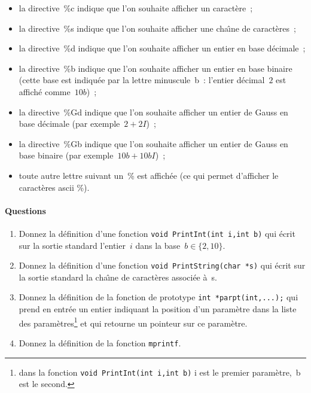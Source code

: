 \begin{itemize}
\item  la directive~\%c indique que l'on souhaite afficher un caract\`ere~;
\item la directive~\%s indique que l'on souhaite afficher une
  cha\^\i{}ne de caract\`eres~;
\item la directive~\%d indique que l'on souhaite afficher un entier en
  base d\'ecimale~;
\item la directive~\%b indique que l'on souhaite afficher un entier en
  base binaire (cette base est indiqu\'ee par la lettre
  minuscule~b~: l'entier d\'ecimal~$2$ est affich\'e comme~$10b$)~;
\item la directive~\%Gd indique que l'on souhaite afficher un entier de
  Gauss en base d\'ecimale (par exemple~$2 + 2 I$)~;
\item la directive~\%Gb indique que l'on souhaite afficher un entier
  de Gauss en base binaire (par exemple~$ 10b + 10b I$)~;
\item toute autre lettre suivant un~\% est affich\'ee (ce qui permet
  d'afficher le caract\`eres ascii \%).
\end{itemize}

\paragraph{Questions}
\begin{enumerate}
\item Donnez la d\'efinition d'une fonction %
  \verb?void PrintInt(int i,int b)? qui \'ecrit sur la sortie
  standard l'entier~$i$ dans la base~${b\in\{2,10\}}$.
\item 
  Donnez la d\'efinition d'une fonction %
  \verb?void PrintString(char *s)? qui \'ecrit sur la sortie standard
  la cha\^\i{}ne de caract\`eres associ\'ee \`a~s.
\item Donnez la d\'efinition de la fonction de prototype %
  \verb?int *parpt(int,...);? qui prend en entr\'ee un entier
  indiquant la position d'un param\`etre
dans la liste des param\`etres\footnote{dans la fonction %
  \verb?void PrintInt(int i,int b)? i est le premier param\`etre,~b est le second.}
et qui retourne un pointeur sur ce param\`etre.
\item Donnez la d\'efinition de la fonction \verb?mprintf?.
\end{enumerate}

